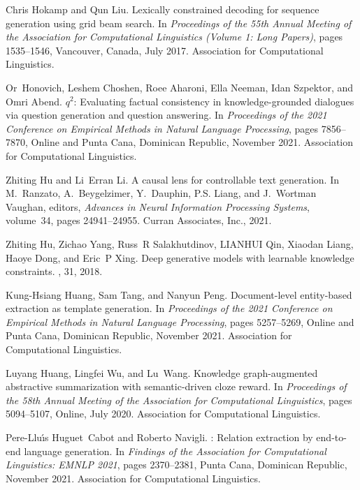 \documentclass[11pt]{article}
\begin{document}
\begin{thebibliography}{100}
Chris Hokamp and Qun Liu.
\newblock Lexically constrained decoding for sequence generation using grid
  beam search.
\newblock In {\em Proceedings of the 55th Annual Meeting of the Association for
  Computational Linguistics (Volume 1: Long Papers)}, pages 1535--1546,
  Vancouver, Canada, July 2017. Association for Computational Linguistics.

Or~Honovich, Leshem Choshen, Roee Aharoni, Ella Neeman, Idan Szpektor, and Omri
  Abend.
\newblock $q^{2}$: {E}valuating factual consistency in knowledge-grounded
  dialogues via question generation and question answering.
\newblock In {\em Proceedings of the 2021 Conference on Empirical Methods in
  Natural Language Processing}, pages 7856--7870, Online and Punta Cana,
  Dominican Republic, November 2021. Association for Computational Linguistics.

Zhiting Hu and Li~Erran Li.
\newblock A causal lens for controllable text generation.
\newblock In M.~Ranzato, A.~Beygelzimer, Y.~Dauphin, P.S. Liang, and J.~Wortman
  Vaughan, editors, {\em Advances in Neural Information Processing Systems},
  volume~34, pages 24941--24955. Curran Associates, Inc., 2021.

Zhiting Hu, Zichao Yang, Russ~R Salakhutdinov, LIANHUI Qin, Xiaodan Liang,
  Haoye Dong, and Eric~P Xing.
\newblock Deep generative models with learnable knowledge constraints.
, 31, 2018.

Kung-Hsiang Huang, Sam Tang, and Nanyun Peng.
\newblock Document-level entity-based extraction as template generation.
\newblock In {\em Proceedings of the 2021 Conference on Empirical Methods in
  Natural Language Processing}, pages 5257--5269, Online and Punta Cana,
  Dominican Republic, November 2021. Association for Computational Linguistics.

Luyang Huang, Lingfei Wu, and Lu~Wang.
\newblock Knowledge graph-augmented abstractive summarization with
  semantic-driven cloze reward.
\newblock In {\em Proceedings of the 58th Annual Meeting of the Association for
  Computational Linguistics}, pages 5094--5107, Online, July 2020. Association
  for Computational Linguistics.

Pere-Llu{\'\i}s Huguet~Cabot and Roberto Navigli.
: Relation extraction by end-to-end language generation.
\newblock In {\em Findings of the Association for Computational Linguistics:
  EMNLP 2021}, pages 2370--2381, Punta Cana, Dominican Republic, November 2021.
  Association for Computational Linguistics.


\end{thebibliography}
\end{document}
